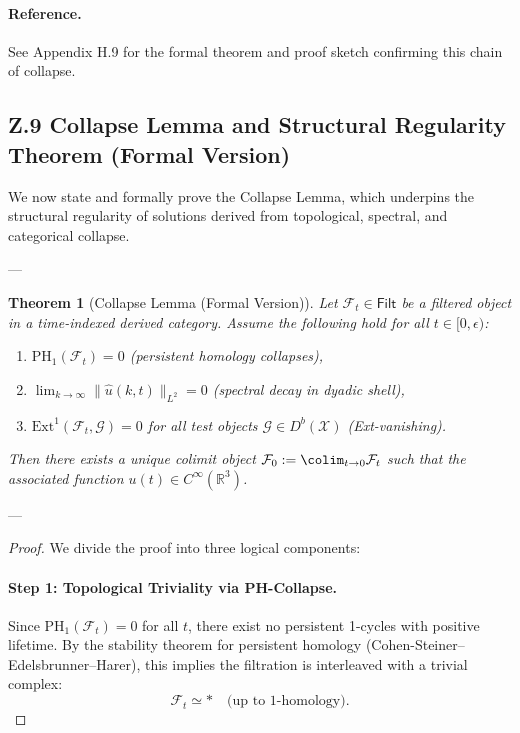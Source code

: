 \documentclass[11pt]{article}
\newtheorem{theorem}{Theorem}[section]
\begin{document}
\begin{axiom}
\begin{axiom}
{{\paragraph{Reference.}  
See Appendix H.9 for the formal theorem and proof sketch confirming this chain of collapse.



\subsection*{Z.9 Collapse Lemma and Structural Regularity Theorem (Formal Version)}

We now state and formally prove the Collapse Lemma, which underpins the structural regularity  
of solutions derived from topological, spectral, and categorical collapse.

---

\begin{theorem}[Collapse Lemma (Formal Version)]
\label{thm:collapse}
Let \( \mathcal{F}_t \in \mathsf{Filt} \) be a filtered object in a time-indexed derived category.  
Assume the following hold for all \( t \in [0, \epsilon) \):

\begin{enumerate}
    \item[(1)] \( \mathrm{PH}_1(\mathcal{F}_t) = 0 \) (persistent homology collapses),
    \item[(2)] \( \lim_{k \to \infty} \| \widehat{u}(k, t) \|_{L^2} = 0 \) (spectral decay in dyadic shell),
    \item[(3)] \( \mathrm{Ext}^1(\mathcal{F}_t, \mathcal{G}) = 0 \) for all test objects \( \mathcal{G} \in D^b(\mathcal{X}) \) (Ext-vanishing).
\end{enumerate}

Then there exists a unique colimit object \( \mathcal{F}_0 := \colim_{t \to 0} \mathcal{F}_t \)  
such that the associated function \( u(t) \in C^\infty(\mathbb{R}^3) \).
\end{theorem}

---

\begin{proof}
We divide the proof into three logical components:

\paragraph{Step 1: Topological Triviality via PH-Collapse.}
Since \( \mathrm{PH}_1(\mathcal{F}_t) = 0 \) for all \( t \),  
there exist no persistent 1-cycles with positive lifetime.  
By the stability theorem for persistent homology (Cohen-Steiner–Edelsbrunner–Harer),  
this implies the filtration is interleaved with a trivial complex:  
\[
\mathcal{F}_t \simeq \ast \quad \text{(up to 1-homology)}.
\]


\end{proof}}}
\end{axiom}
\end{axiom}
\end{document}
